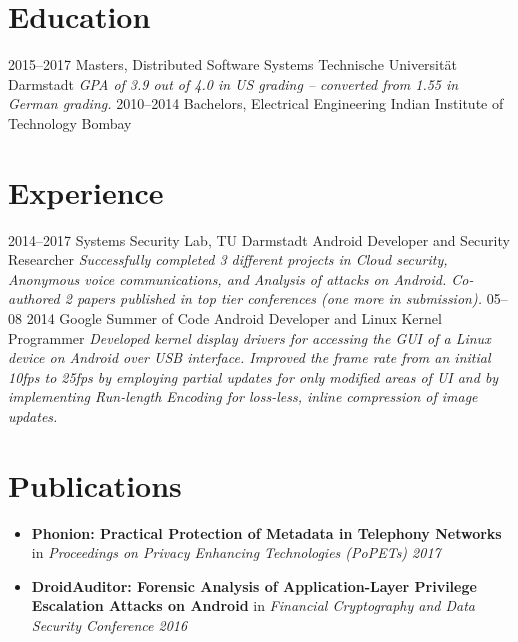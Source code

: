 \documentclass[]{friggeri-cv}
\begin{document}
\section{Education}
\begin{entrylist}
  \entry
    {2015–2017}
    {Masters, {\normalfont Distributed Software Systems}}
    {Technische Universität Darmstadt}
    {\emph{GPA of 3.9 out of 4.0 in US grading -- converted from 1.55 in German grading.}}
  \entry
    {2010–2014}
    {Bachelors, {\normalfont Electrical Engineering}}
    {Indian Institute of Technology Bombay}
    {}%
\end{entrylist}

\section{Experience}
\begin{entrylist}
  \entry
    {2014–2017}
    {Systems Security Lab, TU Darmstadt}
    {Android Developer and Security Researcher}
    {\emph{Successfully completed 3 different projects in Cloud security, Anonymous voice communications, and Analysis of attacks on Android. Co-authored 2 papers published in top tier conferences (one more in submission).}}
  \entry
    {05–08 2014}
    {Google Summer of Code}
    {Android Developer and Linux Kernel Programmer}
    {\emph{Developed kernel display drivers for accessing the GUI of a Linux device on Android over USB interface. Improved the frame rate from an initial 10fps to 25fps by employing partial updates for only modified areas of UI and by implementing Run-length Encoding for loss-less, inline compression of image updates.}}
\end{entrylist}

\section{Publications}
\begin{itemize}
  \item \textbf{Phonion: Practical Protection of Metadata in Telephony Networks} in \textit{Proceedings on Privacy Enhancing Technologies (PoPETs) 2017}
  \item \textbf{DroidAuditor: Forensic Analysis of Application-Layer Privilege Escalation Attacks on Android} in \textit{Financial Cryptography and Data Security Conference 2016}
\end{itemize}
\vspace{0.3cm}
\end{document}
